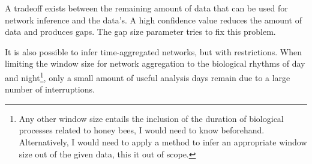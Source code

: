 A tradeoff exists between the remaining amount of data that can be used for network inference and the data's.
A high confidence value reduces the amount of data and produces gaps.
The gap size parameter tries to fix this problem. 

It is also possible to infer time-aggregated networks, but with restrictions.
When limiting the window size for network aggregation to the biological rhythms of day and night\footnote{Any other window size entails the inclusion of the duration of biological processes related to honey bees, I would need to know beforehand. Alternatively, I would need to apply a method to infer an appropriate window size out of the given data, this it out of scope.}, only a small amount of useful analysis days remain due to a large number of interruptions.